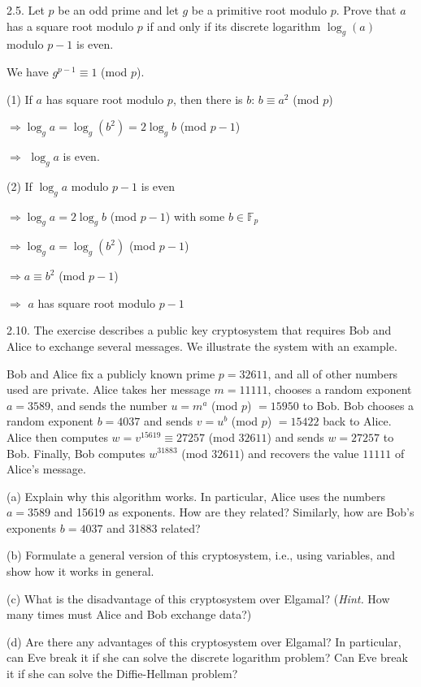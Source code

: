 2.5. Let $p$ be an odd prime and let $g$ be a primitive root modulo $p$. Prove that $a$ has a square root modulo $p$ if and only if its discrete logarithm $\log_g(a)$ modulo $p-1$ is even. 

We have $g^{p-1} \equiv 1$ (mod $p$).

(1) If $a$ has square root modulo $p$, then there is $b$: $b \equiv a^2$ (mod $p$)

$\Rightarrow \log_ga = \log_g(b^2) = 2\log_gb$ (mod $p-1$)

$\Rightarrow$ $\log_ga$ is even. 

(2) If $\log_ga$ modulo $p-1$ is even

$\Rightarrow \log_ga = 2\log_gb$ (mod $p-1$) with some $b \in \mathbb{F}_p$

$\Rightarrow \log_ga = \log_g(b^2)$ (mod $p-1$)

$\Rightarrow a \equiv b^2$ (mod $p-1$)

$\Rightarrow$ $a$ has square root modulo $p-1$

2.10. The exercise describes a public key cryptosystem that requires Bob and Alice to exchange several messages. We illustrate the system with an example.

Bob and Alice fix a publicly known prime $p=32611$, and all of other numbers used are private. Alice takes her message $m=11111$, chooses a random exponent $a=3589$, and sends the number $u=m^a$ (mod $p$) $=15950$ to Bob. Bob chooses a random exponent $b=4037$ and sends $v=u^b$ (mod $p$) $=15422$ back to Alice. Alice then computes $w=v^{15619} \equiv 27257$ (mod $32611$) and sends $w=27257$ to Bob. Finally, Bob computes $w^{31883}$ (mod $32611$) and recovers the value $11111$ of Alice's message.

(a) Explain why this algorithm works. In particular, Alice uses the numbers $a=3589$ and 15619 as exponents. How are they related? Similarly, how are Bob's exponents $b=4037$ and 31883 related?

(b) Formulate a general version of this cryptosystem, i.e., using variables, and show how it works in general.

(c) What is the disadvantage of this cryptosystem over Elgamal? (\textit{Hint.} How many times must Alice and Bob exchange data?)

(d) Are there any advantages of this cryptosystem over Elgamal? In particular, can Eve break it if she can solve the discrete logarithm problem? Can Eve break it if she can solve the Diffie-Hellman problem?

